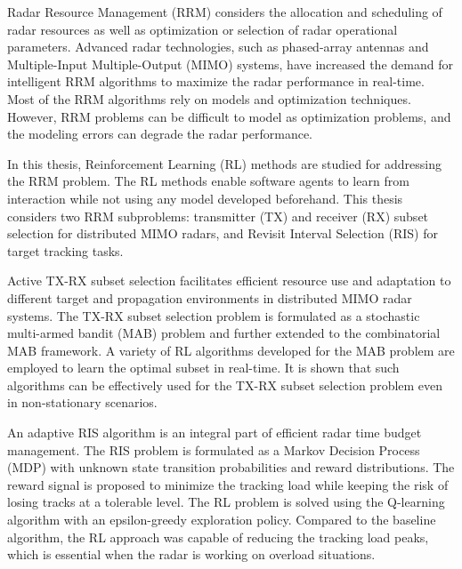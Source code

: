 \documentclass[english, 12pt, a4paper, elec, utf8, a-1b, online]{aaltothesis}
\date{31.7.2020}
\begin{document}
\makecoverpage

\makecopyrightpage


\begin{abstractpage}[english]
Radar Resource Management (RRM) considers the allocation and scheduling of radar resources as well as optimization or selection of radar operational parameters.
Advanced radar technologies, such as phased-array antennas and Multiple-Input Multiple-Output (MIMO) systems, have increased the demand for intelligent RRM algorithms to maximize the radar performance in real-time. 
Most of the RRM algorithms rely on models and optimization techniques. 
However, RRM problems can be difficult to model as optimization problems, and the modeling errors can degrade the radar performance.

In this thesis, Reinforcement Learning (RL) methods are studied for addressing the RRM problem. 
The RL methods enable software agents to learn from interaction while not using any model developed beforehand. 
This thesis considers two RRM subproblems: transmitter (TX) and receiver (RX) subset selection for distributed MIMO radars, and Revisit Interval Selection (RIS) for target tracking tasks. 

Active TX-RX subset selection facilitates efficient resource use and adaptation to different target and propagation environments in distributed MIMO radar systems. 
The TX-RX subset selection problem is formulated as a stochastic multi-armed bandit (MAB) problem and further extended to the combinatorial MAB framework.
A variety of RL algorithms developed for the MAB problem are employed to learn the optimal subset in real-time. 
It is shown that such algorithms can be effectively used for the TX-RX subset selection problem even in non-stationary scenarios.

An adaptive RIS algorithm is an integral part of efficient radar time budget management.
The RIS problem is formulated as a Markov Decision Process (MDP) with unknown state transition probabilities and reward distributions. 
The reward signal is proposed to minimize the tracking load while keeping the risk of losing tracks at a tolerable level. 
The RL problem is solved using the Q-learning algorithm with an epsilon-greedy exploration policy.
Compared to the baseline algorithm, the RL approach was capable of reducing the tracking load peaks, which is essential when the radar is working on overload situations.
\end{abstractpage}
\end{document}
